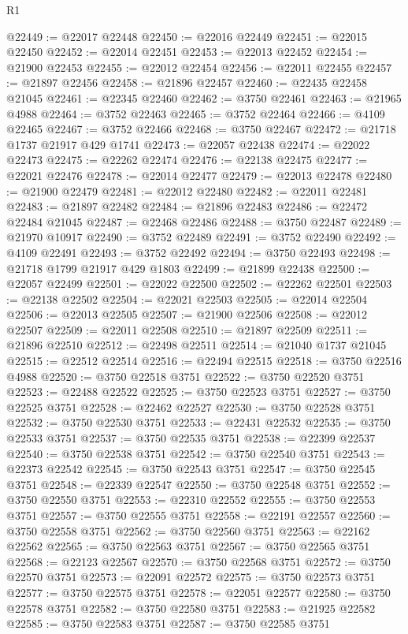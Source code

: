 \begin{lexlean}{R1}
\begin{coremodule}
@22449 := @22017 @22448
@22450 := @22016 @22449
@22451 := @22015 @22450
@22452 := @22014 @22451
@22453 := @22013 @22452
@22454 := @21900 @22453
@22455 := @22012 @22454
@22456 := @22011 @22455
@22457 := @21897 @22456
@22458 := @21896 @22457
@22460 := @22435 @22458 @21045
@22461 := @22345 @22460
@22462 := @3750 @22461
@22463 := @21965 @4988
@22464 := @3752 @22463
@22465 := @3752 @22464
@22466 := @4109 @22465
@22467 := @3752 @22466
@22468 := @3750 @22467
@22472 := @21718 @1737 @21917 @429 @1741
@22473 := @22057 @22438
@22474 := @22022 @22473
@22475 := @22262 @22474
@22476 := @22138 @22475
@22477 := @22021 @22476
@22478 := @22014 @22477
@22479 := @22013 @22478
@22480 := @21900 @22479
@22481 := @22012 @22480
@22482 := @22011 @22481
@22483 := @21897 @22482
@22484 := @21896 @22483
@22486 := @22472 @22484 @21045
@22487 := @22468 @22486
@22488 := @3750 @22487
@22489 := @21970 @10917
@22490 := @3752 @22489
@22491 := @3752 @22490
@22492 := @4109 @22491
@22493 := @3752 @22492
@22494 := @3750 @22493
@22498 := @21718 @1799 @21917 @429 @1803
@22499 := @21899 @22438
@22500 := @22057 @22499
@22501 := @22022 @22500
@22502 := @22262 @22501
@22503 := @22138 @22502
@22504 := @22021 @22503
@22505 := @22014 @22504
@22506 := @22013 @22505
@22507 := @21900 @22506
@22508 := @22012 @22507
@22509 := @22011 @22508
@22510 := @21897 @22509
@22511 := @21896 @22510
@22512 := @22498 @22511
@22514 := @21040 @1737 @21045
@22515 := @22512 @22514
@22516 := @22494 @22515
@22518 := @3750 @22516 @4988
@22520 := @3750 @22518 @3751
@22522 := @3750 @22520 @3751
@22523 := @22488 @22522
@22525 := @3750 @22523 @3751
@22527 := @3750 @22525 @3751
@22528 := @22462 @22527
@22530 := @3750 @22528 @3751
@22532 := @3750 @22530 @3751
@22533 := @22431 @22532
@22535 := @3750 @22533 @3751
@22537 := @3750 @22535 @3751
@22538 := @22399 @22537
@22540 := @3750 @22538 @3751
@22542 := @3750 @22540 @3751
@22543 := @22373 @22542
@22545 := @3750 @22543 @3751
@22547 := @3750 @22545 @3751
@22548 := @22339 @22547
@22550 := @3750 @22548 @3751
@22552 := @3750 @22550 @3751
@22553 := @22310 @22552
@22555 := @3750 @22553 @3751
@22557 := @3750 @22555 @3751
@22558 := @22191 @22557
@22560 := @3750 @22558 @3751
@22562 := @3750 @22560 @3751
@22563 := @22162 @22562
@22565 := @3750 @22563 @3751
@22567 := @3750 @22565 @3751
@22568 := @22123 @22567
@22570 := @3750 @22568 @3751
@22572 := @3750 @22570 @3751
@22573 := @22091 @22572
@22575 := @3750 @22573 @3751
@22577 := @3750 @22575 @3751
@22578 := @22051 @22577
@22580 := @3750 @22578 @3751
@22582 := @3750 @22580 @3751
@22583 := @21925 @22582
@22585 := @3750 @22583 @3751
@22587 := @3750 @22585 @3751

\end{coremodule}
\end{lexlean}
